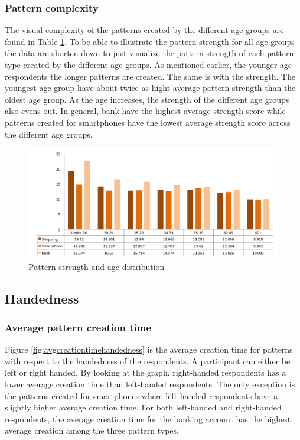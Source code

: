     \subsubsection{Pattern complexity}
    The visual complexity of the patterns created by the different age groups are found in Table \ref{fig:strengthagedist}. To be able to illustrate the pattern strength for all age groups the data are shorten down to just visualize the pattern strength of each pattern type created by the different age groups. As mentioned earlier, the younger age respondents the longer patterns are created. The same is with the strength. The youngest age group have about twice as hight average pattern strength than the oldest age group. As the age increases, the strength of the different age groups also evens out. In general, bank have the highest average strength score while patterns created for smartphones have the lowest average strength score across the different age groups.

    \begin{figure}[H]
      \centering
      \includegraphics[width=\textwidth]{pics/analysis/strengthagedist.png}
      \caption{Pattern strength and age distribution}
      \label{fig:strengthagedist}
    \end{figure}

	\subsection{Handedness}\label{sec:subgroupHandedness}

    \subsubsection{Average pattern creation time}
    Figure \ref{fig:avgcreationtimehandedness} is the average creation time for patterns with respect to the handedness of the respondents. A participant can either be left or right handed. By looking at the graph, right-handed respondents has a lower average creation time than left-handed respondents. The only exception is the patterns created for smartphones where left-handed respondents have a slightly higher average creation time. For both left-handed and right-handed respondents, the average creation time for the banking account has the highest average creation among the three pattern types.  


